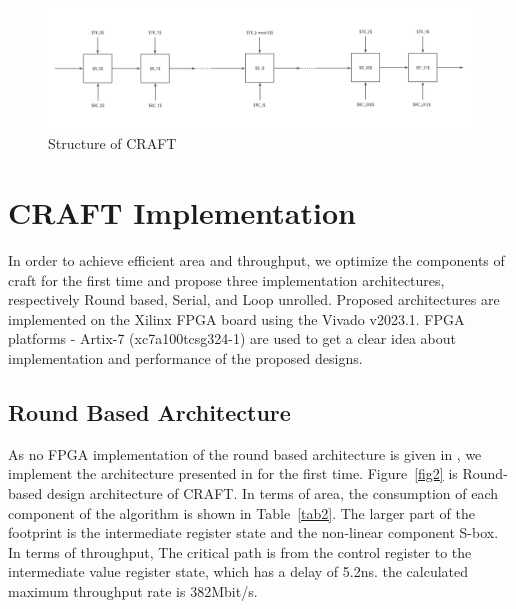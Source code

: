 \documentclass[sn-basic]{sn-jnl}%
\begin{document}
\begin{figure}[h]%
    \caption{Structure of CRAFT}\label{fig1}
    \centering
    \includegraphics[width=\textwidth]{struct_of_craft.png}
\end{figure}


\section{CRAFT Implementation}\label{sec3}

In order to achieve efficient area and throughput, we optimize the components of craft for the first time and propose three implementation architectures, respectively Round based, Serial, and Loop unrolled. 
Proposed architectures are implemented on the Xilinx FPGA board using the Vivado v2023.1. FPGA platforms - Artix-7 (xc7a100tcsg324-1) are used to get a clear idea about implementation and performance of the proposed designs.

\subsection{Round Based Architecture}\label{subsec1}
As no FPGA implementation of the round based architecture is given in \cite{beierle2019craft}, we implement the architecture presented in \cite{beierle2019craft} for the first time. Figure~\ref{fig2} is Round-based design architecture of CRAFT. 
In terms of area, the consumption of each component of the algorithm is shown in Table~\ref{tab2}. 
The larger part of the footprint is the intermediate register state and the non-linear component S-box. 
In terms of throughput, The critical path is from the control register to the intermediate value register state, which has a delay of 5.2ns. the calculated maximum throughput rate is 382Mbit/s.
\end{document}
